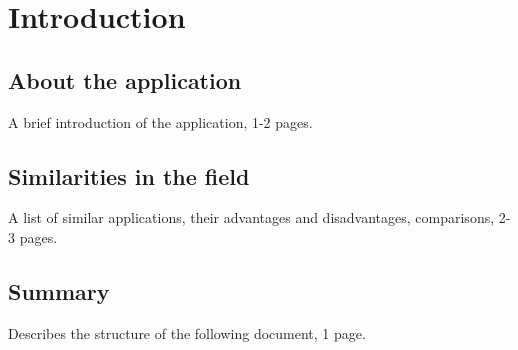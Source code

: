 \chapter{Introduction}\label{ch:INTRO}

\section{About the application}\label{sec:INTRO:about}
A brief introduction of the application, 1-2 pages.

\section{Similarities in the field}\label{sec:INTRO:sa}
A list of similar applications, their advantages and disadvantages, comparisons, 2-3 pages.

\section{Summary}\label{sec:INTRO:sum}
Describes the structure of the following document, 1 page.